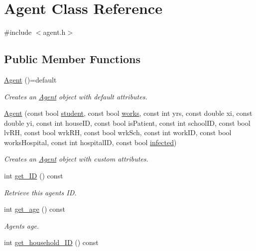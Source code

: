 \hypertarget{classAgent}{}\section{Agent Class Reference}
\label{classAgent}


{\ttfamily \#include $<$agent.\+h$>$}

\subsection*{Public Member Functions}
\begin{DoxyCompactItemize}
\item 
\hyperlink{classAgent_adbc1a27ec2c086160d3c28622ea02f3b}{Agent} ()=default
\begin{DoxyCompactList}\small\item\em Creates an \hyperlink{classAgent}{Agent} object with default attributes. \end{DoxyCompactList}\item 
\hyperlink{classAgent_a8b2a1eebca05ea3ac1a9b6dc1fc4681f}{Agent} (const bool \hyperlink{classAgent_aaafd3f91e823471cdfdcf4c31cdebd7d}{student}, const bool \hyperlink{classAgent_ab587c852bf9894f46b073f77fad42719}{works}, const int yrs, const double xi, const double yi, const int house\+ID, const bool is\+Patient, const int school\+ID, const bool lv\+RH, const bool wrk\+RH, const bool wrk\+Sch, const int work\+ID, const bool works\+Hospital, const int hospital\+ID, const bool \hyperlink{classAgent_abb85f9353fdaa27e69606b3c1e8fa364}{infected})
\begin{DoxyCompactList}\small\item\em Creates an \hyperlink{classAgent}{Agent} object with custom attributes. \end{DoxyCompactList}\item 
int \hyperlink{classAgent_a62a2d0e19950f7ae9552a3081ced2b29}{get\+\_\+\+ID} () const
\begin{DoxyCompactList}\small\item\em Retrieve this agents ID. \end{DoxyCompactList}\item 
int \hyperlink{classAgent_ada1fc5f6ea889ac641b3f373f47222e1}{get\+\_\+age} () const
\begin{DoxyCompactList}\small\item\em Agents age. \end{DoxyCompactList}\item 
int \hyperlink{classAgent_a67330abc8e8a042e538ee32fae1c5d1c}{get\+\_\+household\+\_\+\+ID} () const

\end{DoxyCompactItemize}
